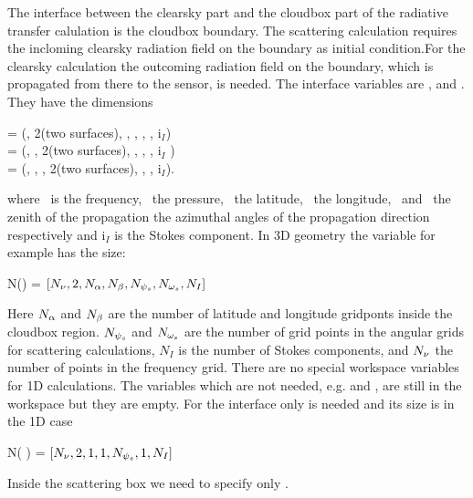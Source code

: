 \label{sec:scattering:interface}
The interface between the clearsky part and the cloudbox part of the
radiative transfer calulation is the cloudbox boundary. The scattering
calculation requires the incloming clearsky radiation field on the
boundary as initial condition.For the clearsky calculation the
outcoming radiation field on the boundary, which is propagated from
there to the sensor, is needed.  The interface variables are
,  and
. They have the dimensions
\begin{center}
   =  (\Frq, 2(two surfaces), \Lat, \Lon, \ScaZa, \ScaAa, i$_I$)\\
   =  (\Frq, \Prs,
  2(two surfaces), \Lon, \ScaZa,
  \ScaAa, i$_I$ )\\
   =  (\Frq, \Prs,
  \Lat, 2(two surfaces), \ScaZa, \ScaAa, i$_I$).
\end{center}
where \Frq\ is the frequency, \Prs\ the pressure, \Lat\ the latitude,
\Lon\ the longitude, \ScaZa\ and \ScaAa\ the zenith of the propagation
the azimuthal angles of the propagation direction respectively and
i$_I$ is the Stokes component.  In 3D geometry the variable
 for example has the size:
\begin{center}
  N() = $[N_{\nu}, 2, N_{\alpha}, N_{\beta}, N_{{\psi_s}},
  N_{{\omega_s}}, N_I]$
\end{center} 

Here $N_{\alpha}$ and $N_{\beta}$ are the number of latitude and longitude
gridponts inside the cloudbox region. $N_{{\psi_s}}$ and $N_{{\omega_s}}$ are
the number of grid points in the angular grids for scattering
calculations, $N_I$ is the number of Stokes components, and $N_{\nu}$
the number of points in the frequency grid.  There are no special
workspace variables for 1D calculations. The variables which are not
needed, e.g.  and , are
still in the workspace but they are empty. For the interface only
 is needed and its size is in the 1D case
\begin{center}
  N(  ) = $[N_{\nu}, 2, 1, 1, N_{{\psi_s}}, 1, N_I]$
\end{center}  
Inside the scattering box we need to specify only
.



